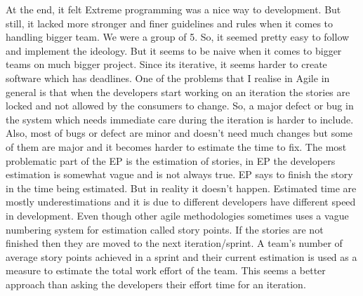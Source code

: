 \documentclass[12pt]{article}
\begin{document}
At the end, it felt Extreme programming was a nice way to development. But still, it lacked more stronger and finer guidelines and rules when it comes to handling bigger team. We were a group of 5. So, it seemed pretty easy to follow and implement the ideology. But it seems to be naive when it comes to bigger teams on much bigger project. Since its iterative, it seems harder to create software which has deadlines. One of the problems that I realise in Agile in general is that when the developers start working on an iteration the stories are locked and not allowed by the consumers to change. So, a major defect or bug in the system which needs immediate care during the iteration is harder to include. Also, most of bugs or defect are minor and doesn't need much changes but some of them are major and it becomes harder to estimate the time to fix. The most problematic part of the EP is the estimation of stories, in EP the developers estimation is somewhat vague and is not always true. EP says to finish the story in the time being estimated. But in reality it doesn't happen. Estimated time are mostly underestimations and it is due to different developers have different speed in development. Even though other agile methodologies sometimes uses a vague numbering system for estimation called story points. If the stories are not finished then they are moved to the next iteration/sprint. A team's number of average story points achieved in a sprint and their current estimation is used as a measure to estimate the total work effort of the team. This seems a better approach than asking the developers their effort time for an iteration.
\end{document}

